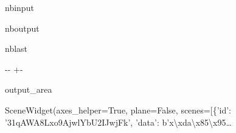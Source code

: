 \documentclass[letterpaper,10pt,english]{sphinxmanual}
\begin{document}
\begin{sphinxuseclass}{nbinput}
{
\begin{sphinxVerbatim}[commandchars=\\\{\}]
\llap{\color{nbsphinxin}[28]:\,\hspace{\fboxrule}\hspace{\fboxsep}}
              
             
              
\end{sphinxVerbatim}
}

\end{sphinxuseclass}
\begin{sphinxuseclass}{nboutput}
\begin{sphinxuseclass}{nblast}
{

\kern-\sphinxverbatimsmallskipamount\kern-\baselineskip
\kern+\FrameHeightAdjust\kern-\fboxrule
\vspace{\nbsphinxcodecellspacing}

\begin{sphinxuseclass}{output_area}
\begin{sphinxuseclass}{}


\begin{sphinxVerbatim}[commandchars=\\\{\}]
\llap{\color{nbsphinxout}[28]:\,\hspace{\fboxrule}\hspace{\fboxsep}}SceneWidget(axes\_helper=True, plane=False, scenes=[\{'id': '31qAWA8Lxo9AjwlYbU2IJwjFk', 'data': b'x\textbackslash{}xda\textbackslash{}x85\textbackslash{}x95…
\end{sphinxVerbatim}



\end{sphinxuseclass}
\end{sphinxuseclass}
}

\end{sphinxuseclass}
\end{sphinxuseclass}
\end{document}
